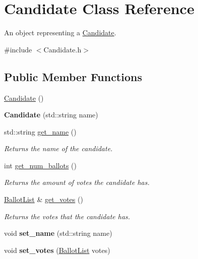\hypertarget{class_candidate}{}\section{Candidate Class Reference}
\label{class_candidate}


An object representing a \mbox{\hyperlink{class_candidate}{Candidate}}.  




{\ttfamily \#include $<$Candidate.\+h$>$}

\subsection*{Public Member Functions}
\begin{DoxyCompactItemize}
\item 
\mbox{\hyperlink{class_candidate_aa2747741fb662af5e8f3d01d1d1a43b6}{Candidate}} ()
\item 
\mbox{\label{class_candidate_a99c1eda1eeecf4bbd054049449954c90}} 
{\bfseries Candidate} (std\+::string name)
\item 
\mbox{\label{class_candidate_a9012b2acb87ecf5cfc3ba693f8c66ca1}} 
std\+::string \mbox{\hyperlink{class_candidate_a9012b2acb87ecf5cfc3ba693f8c66ca1}{get\+\_\+name}} ()
\begin{DoxyCompactList}\small\item\em Returns the name of the candidate. \end{DoxyCompactList}\item 
\mbox{\label{class_candidate_a4b7d42b2508d8899a2662e3b8edbb60d}} 
int \mbox{\hyperlink{class_candidate_a4b7d42b2508d8899a2662e3b8edbb60d}{get\+\_\+num\+\_\+ballots}} ()
\begin{DoxyCompactList}\small\item\em Returns the amount of votes the candidate has. \end{DoxyCompactList}\item 
\mbox{\label{class_candidate_a3908fe9bb0b7a58def1d1b7dbc0bb80e}} 
\mbox{\hyperlink{class_ballot_list}{Ballot\+List}} \& \mbox{\hyperlink{class_candidate_a3908fe9bb0b7a58def1d1b7dbc0bb80e}{get\+\_\+votes}} ()
\begin{DoxyCompactList}\small\item\em Returns the votes that the candidate has. \end{DoxyCompactList}\item 
\mbox{\label{class_candidate_a8b3f41d0b9792719dde4f10b643fe527}} 
void {\bfseries set\+\_\+name} (std\+::string name)
\item 
\mbox{\label{class_candidate_a3dc60636fcff3f931cb6f2a071f168fa}} 
void {\bfseries set\+\_\+votes} (\mbox{\hyperlink{class_ballot_list}{Ballot\+List}} votes)
\end{DoxyCompactItemize}


